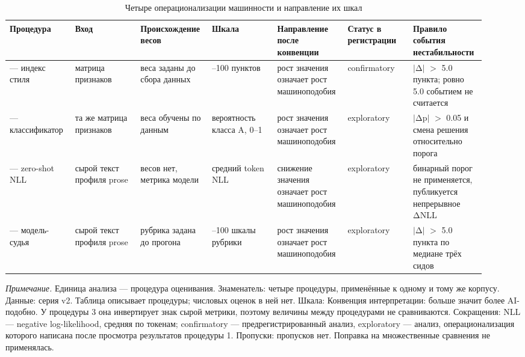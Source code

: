 \begin{table}[htbp]
\centering
\small
\caption{Четыре операционализации машинности и направление их шкал}
\label{tab:2}
\begin{tabular}{>{\raggedright\arraybackslash}p{0.131\linewidth}>{\raggedright\arraybackslash}p{0.131\linewidth}>{\raggedright\arraybackslash}p{0.131\linewidth}>{\raggedright\arraybackslash}p{0.131\linewidth}>{\raggedright\arraybackslash}p{0.131\linewidth}>{\raggedright\arraybackslash}p{0.131\linewidth}>{\raggedright\arraybackslash}p{0.131\linewidth}}
\toprule
Процедура & Вход & Происхождение весов & Шкала & Направление после конвенции & Статус в регистрации & Правило события нестабильности \\
\midrule
1 — индекс стиля & матрица признаков & веса заданы до сбора данных & 0–100 пунктов & рост значения означает рост машиноподобия & confirmatory & $|$Δ$|$ $>$ 5.0 пункта; ровно 5.0 событием не считается \\
2 — классификатор & та же матрица признаков & веса обучены по данным & вероятность класса A, 0–1 & рост значения означает рост машиноподобия & exploratory & $|$Δp$|$ $>$ 0.05 и смена решения относительно порога \\
3 — zero-shot NLL & сырой текст профиля prose & весов нет, метрика модели & средний token NLL & снижение значения означает рост машиноподобия & exploratory & бинарный порог не применяется, публикуется непрерывное ΔNLL \\
4 — модель-судья & сырой текст профиля prose & рубрика задана до прогона & 0–100 шкалы рубрики & рост значения означает рост машиноподобия & exploratory & $|$Δ$|$ $>$ 5.0 пункта по медиане трёх сидов \\
\bottomrule
\end{tabular}
\begin{minipage}{\linewidth}\footnotesize\vspace{2pt}
\textit{Примечание.} Единица анализа — процедура оценивания. Знаменатель: четыре процедуры, применённые к одному и тому же корпусу. Данные: серия v2. Таблица описывает процедуры; числовых оценок в ней нет. Шкала: Конвенция интерпретации: больше значит более AI-подобно. У процедуры 3 она инвертирует знак сырой метрики, поэтому величины между процедурами не сравниваются. Сокращения: NLL — negative log-likelihood, средняя по токенам; confirmatory — предрегистрированный анализ, exploratory — анализ, операционализация которого написана после просмотра результатов процедуры 1. Пропуски: пропусков нет. Поправка на множественные сравнения не применялась.
\end{minipage}
\end{table}
